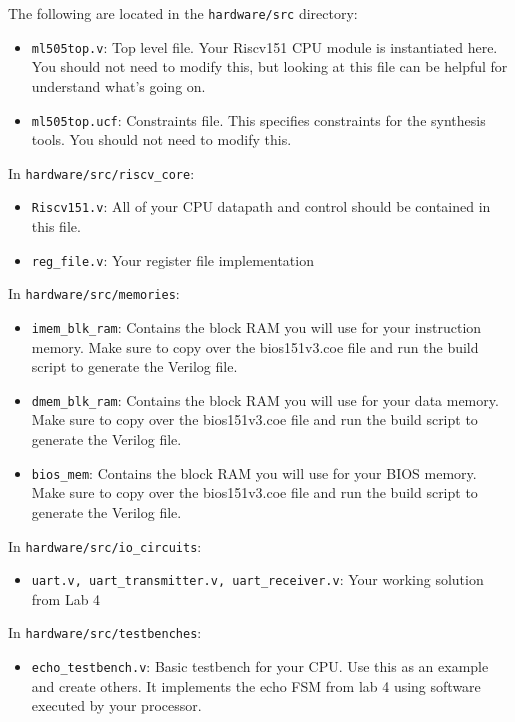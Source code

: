 \documentclass[11pt]{article}
\begin{document}
The following are located in the \verb|hardware/src| directory:
\begin{itemize}
	\item \verb|ml505top.v|: Top level file. Your Riscv151 CPU module is instantiated here. You should not need to modify this, but looking at this file can be helpful for understand what's going on.
	\item \verb|ml505top.ucf|: Constraints file. This specifies constraints for the synthesis tools. You should not need to modify this.
\end{itemize}

In \verb|hardware/src/riscv_core|:
\begin{itemize}
	\item \verb|Riscv151.v|: All of your CPU datapath and control should be contained in this file.
	\item \verb|reg_file.v|: Your register file implementation
\end{itemize}

In \verb|hardware/src/memories|:
\begin{itemize}
	\item \verb|imem_blk_ram|: Contains the block RAM you will use for your instruction memory. Make sure to copy over the bios151v3.coe file and run the build script to generate the Verilog file.
	\item \verb|dmem_blk_ram|: Contains the block RAM you will use for your data memory. Make sure to copy over the bios151v3.coe file and run the build script to generate the Verilog file.
	\item \verb|bios_mem|: Contains the block RAM you will use for your BIOS memory. Make sure to copy over the bios151v3.coe file and run the build script to generate the Verilog file.
\end{itemize}

In \verb|hardware/src/io_circuits|:
\begin{itemize}
	\item \verb|uart.v, uart_transmitter.v, uart_receiver.v|: Your working solution from Lab 4
\end{itemize}

In \verb|hardware/src/testbenches|:
\begin{itemize}
	\item \verb|echo_testbench.v|: Basic testbench for your CPU. Use this as an example and create others. It implements the echo FSM from lab 4 using software executed by your processor.
\end{itemize}
\end{document}
